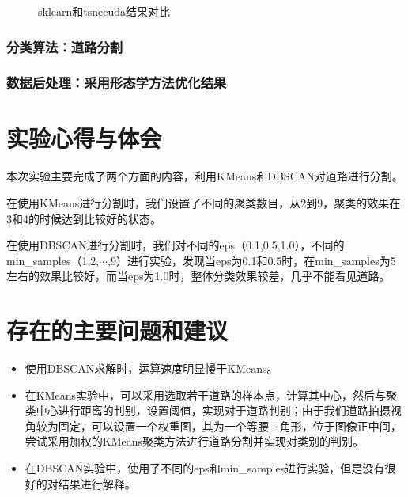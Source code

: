 \documentclass[12pt,hyperref,a4paper,UTF8]{ctexart}
\begin{document}
{\begin{figure}[htbp]
	\centering
	\caption{sklearn和tsnecuda结果对比}
	\label{fig:tsnecuda缺点}
\end{figure}

\subsubsection{分类算法：道路分割}


\subsubsection{数据后处理：采用形态学方法优化结果}


\section{实验心得与体会}
本次实验主要完成了两个方面的内容，利用KMeans和DBSCAN对道路进行分割。

在使用KMeans进行分割时，我们设置了不同的聚类数目，从2到9，聚类的效果在3和4的时候达到比较好的状态。

在使用DBSCAN进行分割时，我们对不同的eps（0.1,0.5,1.0），不同的min\_samples（1,2,$\cdots$,9）进行实验，发现当eps为0.1和0.5时，在min\_samples为5左右的效果比较好，而当eps为1.0时，整体分类效果较差，几乎不能看见道路。


\section{存在的主要问题和建议}

\begin{itemize}
    \item 使用DBSCAN求解时，运算速度明显慢于KMeans。
    \item 在KMeans实验中，可以采用选取若干道路的样本点，计算其中心，然后与聚类中心进行距离的判别，设置阈值，实现对于道路判别；由于我们道路拍摄视角较为固定，可以设置一个权重图，其为一个等腰三角形，位于图像正中间，尝试采用加权的KMeans聚类方法进行道路分割并实现对类别的判别。
    \item 在DBSCAN实验中，使用了不同的eps和min\_samples进行实验，但是没有很好的对结果进行解释。
\end{itemize}


}
\end{document}
